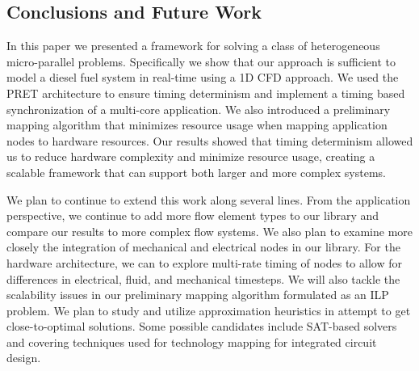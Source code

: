 \subsection{Conclusions and Future Work}
	In this paper we presented a framework for solving a class of heterogeneous micro-parallel problems.  
	Specifically we show that our approach is sufficient to model a diesel fuel system in real-time using a 1D CFD approach.
	We used the PRET architecture to ensure timing determinism and implement a timing based synchronization of a multi-core application.
	We also introduced a preliminary mapping algorithm that minimizes resource usage when mapping application nodes to hardware resources.
	Our results showed that timing determinism allowed us to reduce hardware complexity and minimize resource usage, creating a scalable framework that can support both larger and more complex systems.  
	
	We plan to continue to extend this work along several lines.  
	From the application perspective, we continue to add more flow element types to our library and compare our results to more complex flow systems.  
	We also plan to examine more closely the integration of mechanical and electrical nodes in our library.
	For the hardware architecture, we can to explore multi-rate timing of nodes to allow for differences in electrical, fluid, and mechanical timesteps.  
	We will also tackle the scalability issues in our preliminary mapping algorithm formulated as an ILP problem. 
	We plan to study and utilize approximation heuristics in attempt to get close-to-optimal solutions.  
	Some possible candidates include SAT-based solvers and covering techniques used for technology mapping for integrated circuit design.  